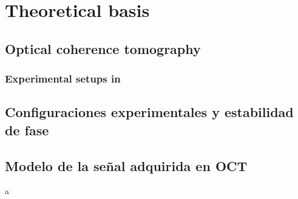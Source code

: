 \newpage
{}
\chapter{Theoretical basis}

\section{Optical coherence tomography}

\subsection{Experimental setups in}

\section{Configuraciones experimentales y estabilidad de fase}

\section{Modelo de la señal adquirida en OCT}

a